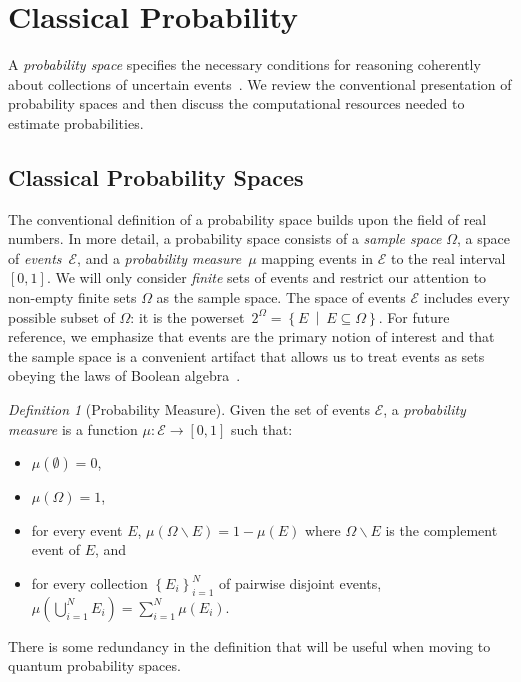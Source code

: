\documentclass{article}
\theoremstyle{remark}
\newtheorem{definition}{Definition}
\newcommand{\events}{\ensuremath{\mathcal{E}}}
\newcommand{\pmeas}{\ensuremath{\mu}}
\newcommand{\set}[2]{\ensuremath{\left\{ {#1}~\middle|~{#2}\right\} }}
\begin{document}
\section{Classical Probability}

A \emph{probability space} specifies the necessary conditions for
reasoning coherently about collections of uncertain
events~\cite{Kolmogorov1950,Shafer1976,Griffiths2003,Swart2013}.  We
review the conventional presentation of probability spaces and then
discuss the computational resources needed to estimate probabilities.

\subsection{Classical Probability Spaces}

The conventional definition of a probability space builds upon the
field of real numbers. In more detail, a probability space consists
of a \emph{sample space} $\Omega$, a space of \emph{events}~$\events$,
and a \emph{probability measure}~$\pmeas$ mapping events in $\events$
to the real interval $[0,1]$. We will only consider \emph{finite}
sets of events and restrict our attention to non-empty finite sets
$\Omega$ as the sample space. The space of events $\events$ includes
every possible subset of $\Omega$: it is the powerset~$2^{\Omega}=\set{E}{E\subseteq\Omega}$.
For future reference, we emphasize that events are the primary notion
of interest and that the sample space is a convenient artifact that
allows us to treat events as sets obeying the laws of Boolean algebra~\cite{Boole1948,Redhead1987-REDINA,Griffiths2003}.

\begin{definition}[Probability Measure]\label{def:ClassicalProbabilitySpace}
  Given the set of events $\events$, a \emph{probability measure} is a
  function $\pmeas:\events\rightarrow[0,1]$ such that:
\begin{itemize}
\item $\pmeas(\emptyset)=0$,
\item $\pmeas(\Omega)=1$, 
\item for every event $E$,
  $\pmeas\left(\Omega\backslash E\right)=1-\pmeas\left(E\right)$ where
  $\Omega\backslash E$ is the complement event of $E$, and
\item for every collection $\left\{ E_{i}\right\} _{i=1}^{N}$ of
  pairwise disjoint events,
  $\pmeas\left(\bigcup_{i=1}^{N}E_{i}\right)=\sum_{i=1}^{N}\pmeas(E_{i})$.
\end{itemize}
\end{definition}
\noindent There is some redundancy in the definition that will be useful when
moving to quantum probability spaces. 
\end{document}
